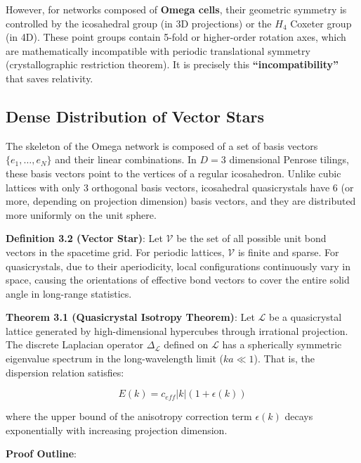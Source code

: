However, for networks composed of \textbf{Omega cells}, their geometric symmetry is controlled by the icosahedral group (in 3D projections) or the $H_4$ Coxeter group (in 4D). These point groups contain 5-fold or higher-order rotation axes, which are mathematically incompatible with periodic translational symmetry (crystallographic restriction theorem). It is precisely this \textbf{``incompatibility''} that saves relativity.

\subsection{Dense Distribution of Vector Stars}

The skeleton of the Omega network is composed of a set of basis vectors $\{e_1, \dots, e_N\}$ and their linear combinations. In $D=3$ dimensional Penrose tilings, these basis vectors point to the vertices of a regular icosahedron.
Unlike cubic lattices with only 3 orthogonal basis vectors, icosahedral quasicrystals have 6 (or more, depending on projection dimension) basis vectors, and they are distributed more uniformly on the unit sphere.

\textbf{Definition 3.2 (Vector Star)}:
Let $\mathcal{V}$ be the set of all possible unit bond vectors in the spacetime grid. For periodic lattices, $\mathcal{V}$ is finite and sparse. For quasicrystals, due to their aperiodicity, local configurations continuously vary in space, causing the orientations of effective bond vectors to cover the entire solid angle in long-range statistics.

\textbf{Theorem 3.1 (Quasicrystal Isotropy Theorem)}:
Let $\mathcal{L}$ be a quasicrystal lattice generated by high-dimensional hypercubes through irrational projection. The discrete Laplacian operator $\Delta_{\mathcal{L}}$ defined on $\mathcal{L}$ has a spherically symmetric eigenvalue spectrum in the long-wavelength limit ($k a \ll 1$). That is, the dispersion relation satisfies:

\[E(k) = c_{eff} |k| \left( 1 + \epsilon(k) \right)\]

where the upper bound of the anisotropy correction term $\epsilon(k)$ decays exponentially with increasing projection dimension.

\textbf{Proof Outline}:

